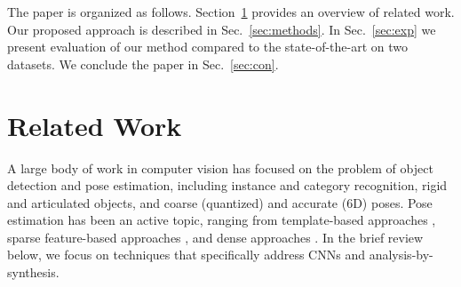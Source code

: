 \documentclass[10pt,letterpaper]{article}
\begin{document}
The paper is organized as follows.
Section~\ref{sec:RelatedWork} provides an overview of related work.
Our proposed approach is described in Sec.~\ref{sec:methods}.
In Sec.~\ref{sec:exp} we present evaluation of our method compared to the state-of-the-art on two datasets.
We conclude the paper in Sec.~\ref{sec:con}.


\section{Related Work}
\label{sec:RelatedWork}

A large body of work in computer vision has focused on the problem of object detection and pose estimation, including instance and category recognition, rigid and articulated objects, and coarse (quantized) and accurate (6D) poses. Pose estimation has been an active topic, ranging from  template-based approaches \cite{hinterstoisser2012accv,dantone_pose_2014}, sparse feature-based approaches \cite{Martinez_Torres_2010}, and dense approaches \cite{Shotton_2013,brachmann2014}.
In the brief review below, we focus on techniques that specifically address CNNs and analysis-by-synthesis.
\end{document}
